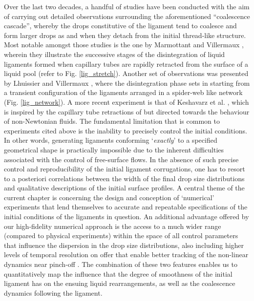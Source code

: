 Over the last two decades, a handful of studies have been conducted 
with the aim of carrying out detailed observations surrounding 
the aforementioned ``coalescence cascade'', whereby the drops 
constitutive of the ligament tend to coalesce and form larger drops
as and when they detach from the initial thread-like structure.
Most notable amongst those studies is the one by Marmottant and Villermaux \cite{vill_3},
wherein they illustrate the successive stages of the disintegration of 
liquid ligaments formed when capillary tubes are rapidly retracted from 
the surface of a liquid pool (refer to Fig. \ref{lig_stretch}). 
Another set of observations was presented by Lhuissier and Villermaux \cite{sheet_hole},
where the disintegration phase sets in starting from a transient configuration
of the ligaments arranged in a spider-web like network (Fig. \ref{lig_network}).  
A more recent experiment is that of Keshavarz et al. \cite{mckinley},
which is inspired by the capillary tube retractions of \cite{vill_3} 
but directed towards the behaviour of non-Newtonian fluids.
The fundamental limitation that is common to experiments cited above 
is the inability to precisely control the initial conditions.
In other words, generating ligaments conforming `\textit{exactly}'
to a specified geometrical shape is practically impossible 
due to the inherent difficulties associated with the control of free-surface flows.  
In the absence of such precise control and reproducibility of the initial 
ligament corrugations, one has to resort to a posteriori correlations between 
the width of the final drop size distributions and qualitative descriptions 
of the initial surface profiles.
A central theme of the current chapter is concerning the design and conception
of `numerical' experiments that lend themselves to accurate and repeatable 
specifications of the initial conditions of the ligaments in question.  
An additional advantage offered by our high-fidelity numerical approach 
is the access to a much wider range (compared to physical experiments) within the 
space of all control parameters that influence the dispersion in the drop size distributions, 
also including higher levels of temporal resolution on offer 
that enable better tracking of the non-linear dynamics near pinch-off
. 
The combination of these two features enables us to quantitatively map the 
influence that the degree of smoothness of the initial ligament has on the ensuing 
liquid rearrangements, as well as the coalescence dynamics following the ligament. 

